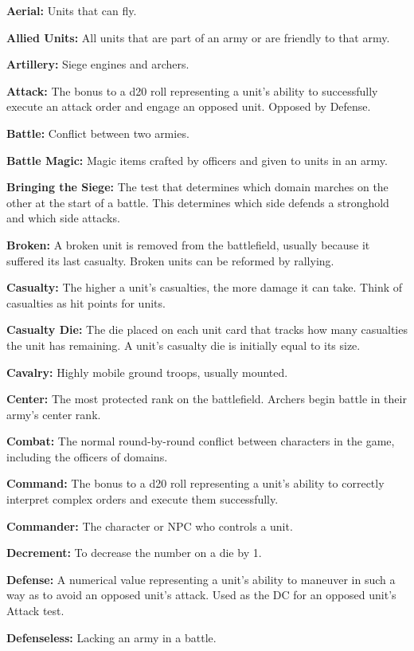 \documentclass[10pt,a4paper,twoside,bg=print,twocolumn,openany,nodeprecatedcode]{dndbook}
\begin{document}
\textbf{Aerial:} Units that can fly.

\textbf{Allied Units:} All units that are part of an army or are friendly to that army.

\textbf{Artillery:} Siege engines and archers.

\textbf{Attack:} The bonus to a d20 roll representing a unit's ability to successfully execute an attack order and engage an opposed unit. Opposed by Defense.

\textbf{Battle:} Conflict between two armies.

\textbf{Battle Magic:} Magic items crafted by officers and given to units in an army.

\textbf{Bringing the Siege:} The test that determines which domain marches on the other at the start of a battle. This determines which side defends a stronghold and which side attacks.

\textbf{Broken:} A broken unit is removed from the battlefield, usually because it suffered its last casualty. Broken units can be reformed by rallying.

\textbf{Casualty:} The higher a unit's casualties, the more damage it can take. Think of casualties as hit points for units.

\textbf{Casualty Die:} The die placed on each unit card that tracks how many casualties the unit has remaining. A unit's casualty die is initially equal to its size.

\textbf{Cavalry:} Highly mobile ground troops, usually mounted.

\textbf{Center:} The most protected rank on the battlefield. Archers begin battle in their army's center rank.

\textbf{Combat:} The normal round-by-round conflict between characters in the game, including the officers of domains.

\textbf{Command:} The bonus to a d20 roll representing a unit's ability to correctly interpret complex orders and execute them successfully.

\textbf{Commander:} The character or NPC who controls a unit.

\textbf{Decrement:} To decrease the number on a die by 1.

\textbf{Defense:} A numerical value representing a unit's ability to maneuver in such a way as to avoid an opposed unit's attack. Used as the DC for an opposed unit's Attack test.

\textbf{Defenseless:} Lacking an army in a battle.
\end{document}
